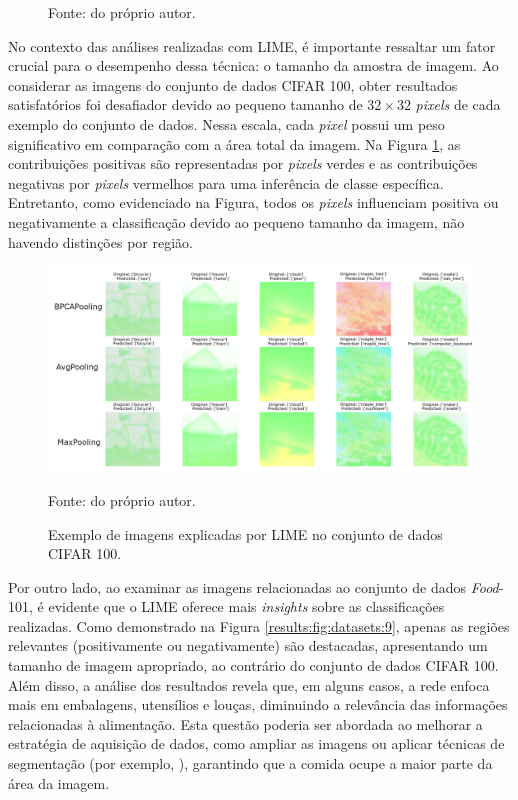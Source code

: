 \begin{figure}[H]
    Fonte: do próprio autor.
\end{figure}

No contexto das análises realizadas com LIME, é importante ressaltar um fator crucial para o desempenho dessa técnica: o tamanho da amostra de imagem. Ao considerar as imagens do conjunto de dados CIFAR 100, obter resultados satisfatórios foi desafiador devido ao pequeno tamanho de $32 \times 32$ \textit{pixels} de cada exemplo do conjunto de dados. Nessa escala, cada \textit{pixel} possui um peso significativo em comparação com a área total da imagem. Na Figura \ref{results:fig:datasets:8}, as contribuições positivas são representadas por \textit{pixels} verdes e as contribuições negativas por \textit{pixels} vermelhos para uma inferência de classe específica. Entretanto, como evidenciado na Figura, todos os \textit{pixels} influenciam positiva ou negativamente a classificação devido ao pequeno tamanho da imagem, não havendo distinções por região.

\begin{figure}[H]
    \centering
    \caption[LIME no CIFAR 100.]{Exemplo de imagens explicadas por LIME no conjunto de dados CIFAR 100.}
    \label{results:fig:datasets:8}
    \includegraphics[width=1\textwidth]{recursos/imagens/results/lime_explanations_cifar.png}

    Fonte: do próprio autor.
\end{figure}

Por outro lado, ao examinar as imagens relacionadas ao conjunto de dados \textit{Food}-101, é evidente que o LIME oferece mais \textit{insights} sobre as classificações realizadas. Como demonstrado na Figura \ref{results:fig:datasets:9}, apenas as regiões relevantes (positivamente ou negativamente) são destacadas, apresentando um tamanho de imagem apropriado, ao contrário do conjunto de dados CIFAR 100. Além disso, a análise dos resultados revela que, em alguns casos, a rede enfoca mais em embalagens, utensílios e louças, diminuindo a relevância das informações relacionadas à alimentação. Esta questão poderia ser abordada ao melhorar a estratégia de aquisição de dados, como ampliar as imagens ou aplicar técnicas de segmentação (por exemplo, \cite{rother2004grabcut}), garantindo que a comida ocupe a maior parte da área da imagem.

